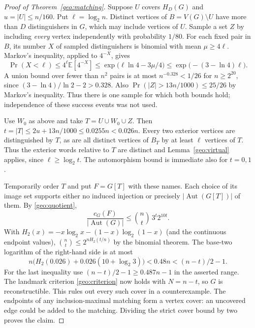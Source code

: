 \begin{proof}[Proof of Theorem~\ref{geo:matching}]
Suppose $U$ covers $H_D(G)$ and $u=|U|\le n/160$. Put
$\ell=\log_2 n$. Distinct vertices of $B=V(G)\setminus U$ have more
than $D$ distinguishers in $G$, which may include vertices of $U$.
Sample a set $Z$ by including \emph{every} vertex independently with
probability $1/80$. For each fixed pair in $B$, its number $X$ of sampled
distinguishers is binomial with mean $\mu\ge4\ell$. Markov's inequality,
applied to $4^{-X}$, gives
\[
 \Pr(X<\ell)\le 4^\ell\mathbb E[4^{-X}]
 \le \exp\bigl(\ell\ln4-3\mu/4\bigr)
 \le \exp\bigl(-(3-\ln4)\ell\bigr).
\]
A union bound over fewer than $n^2$ pairs is at most $n^{-0.328}<1/26$
for $n\ge2^{20}$, since $(3-\ln4)/\ln2-2>0.328$.
Also $\Pr(|Z|>13n/1000)\le25/26$ by Markov's inequality. Thus there is
one sample for which both bounds hold; independence of these success
events was not used.

Use $W_0$ as above and take $T=U\cup W_0\cup Z$. Then
$t=|T|\le2u+13n/1000\le0.0255n<0.026n$. Every two exterior vertices
are distinguished by $T$, as are all distinct vertices of $B_T$ by at
least $\ell$ vertices of $T$. Thus the exterior words relative to $T$
are distinct and Lemma~\ref{geo:virtual} applies, since $\ell\ge\log_2 t$.
The automorphism bound is immediate also for $t=0,1$.

Temporarily order $T$ and put $F=G[T]$ with these names. Each choice of
its image set supports either no induced injection or precisely
$|\operatorname{Aut}(G[T])|$ of them. By \eqref{geo:quotient},
\[
 \frac{c_G(F)}{|\operatorname{Aut}(G)|}
 \le \binom nt\,3^t 2^{10t}.
\]
With $H_2(x)=-x\log_2 x-(1-x)\log_2(1-x)$ (and the continuous endpoint
values), $\binom nt\le2^{n H_2(t/n)}$ by the binomial theorem. The
base-two logarithm of the right-hand side is at most
\[
 n\bigl(H_2(0.026)+0.026(10+\log_2 3)\bigr)<0.48n
 <(n-t)/2-1.
\]
For the last inequality use $(n-t)/2-1\ge0.487n-1$ in the asserted
range. The landmark criterion \eqref{geo:criterion} now holds with
$N=n-t$, so $G$ is reconstructible. This rules out every such
cover in a counterexample. The endpoints of any inclusion-maximal
matching form a vertex cover: an uncovered edge could be added to the
matching. Dividing the strict cover bound by two proves the claim.
\end{proof}
